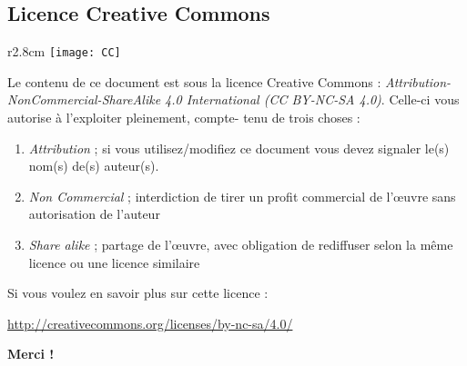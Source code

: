 \subsection*{Licence Creative Commons}
\begin{wrapfigure}[3]{r}{2.8cm}
	\texttt{[image: CC]}
\end{wrapfigure}
Le contenu de ce document est sous la licence Creative Commons : \textit{Attribution-NonCommercial-ShareAlike 
4.0 International (CC BY-NC-SA 4.0)}. Celle-ci vous autorise à l'exploiter pleinement, compte-
tenu de trois choses :
\begin{enumerate}
	\item \textit{Attribution} ; si vous utilisez/modifiez ce document vous devez signaler le(s) nom(s)
	      de(s) auteur(s).
	\item \textit{Non Commercial} ; interdiction de tirer un profit commercial de l’œuvre sans 
	      autorisation de l'auteur 
	\item \textit{Share alike} ;  partage de l’œuvre, avec obligation de rediffuser selon la même 
	      licence ou une licence similaire
\end{enumerate}
Si vous voulez en savoir plus sur cette licence :
\begin{center}
	\url{http://creativecommons.org/licenses/by-nc-sa/4.0/}
\end{center}

\begin{flushright}
	\textbf{Merci ! }
\end{flushright}